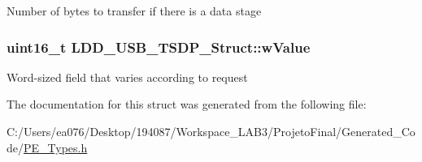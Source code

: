 Number of bytes to transfer if there is a data stage \hypertarget{struct_l_d_d___u_s_b___t_s_d_p___struct_abe97822a1a8976f53da5a43b8db8cfd3}{
\subsubsection[{w\-Value}]{\setlength{\rightskip}{0pt plus 5cm}uint16\-\_\-t L\-D\-D\-\_\-\-U\-S\-B\-\_\-\-T\-S\-D\-P\-\_\-\-Struct\-::w\-Value}}\label{struct_l_d_d___u_s_b___t_s_d_p___struct_abe97822a1a8976f53da5a43b8db8cfd3}
Word-\/sized field that varies according to request 

The documentation for this struct was generated from the following file\-:\begin{DoxyCompactItemize}
\item 
C\-:/\-Users/ea076/\-Desktop/194087/\-Workspace\-\_\-\-L\-A\-B3/\-Projeto\-Final/\-Generated\-\_\-\-Code/\hyperlink{_p_e___types_8h}{P\-E\-\_\-\-Types.\-h}\end{DoxyCompactItemize}
